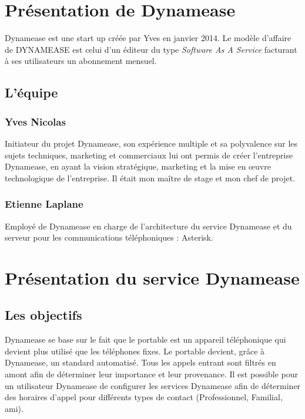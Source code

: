 \section{Présentation de Dynamease}

Dynamease est une start up créée par Yves  en janvier 2014. Le modèle d'affaire de DYNAMEASE est celui d’un éditeur du type \textit{Software As A Service} facturant à ses utilisateurs un abonnement mensuel.

\subsection{L'équipe} 

\subsubsection{Yves Nicolas}

Initiateur du projet Dynamease, son expérience multiple et sa polyvalence sur les sujets techniques, marketing et commerciaux lui ont permis de créer l’entreprise Dynamease, en ayant la vision stratégique, marketing et la mise en œuvre technologique de l’entreprise. Il était mon maître de stage et mon chef de projet.

\subsubsection{Etienne Laplane}

Employé de Dynamease en charge de l’architecture du service Dynamease et du serveur pour les communications téléphoniques : Asterisk.


\section{Présentation du service Dynamease}

\subsection{Les objectifs}

Dynamease se base sur le fait que le portable est un appareil téléphonique qui devient plus utilisé que les téléphones fixes. Le portable devient, grâce à Dynamease, un standard automatisé. Tous les appels entrant sont filtrés en amont afin de déterminer leur importance et leur provenance. Il est possible pour un utilisateur Dynamease de configurer les services Dynamease afin de déterminer des horaires d'appel pour différents types de contact (Professionnel, Familial, ami).

